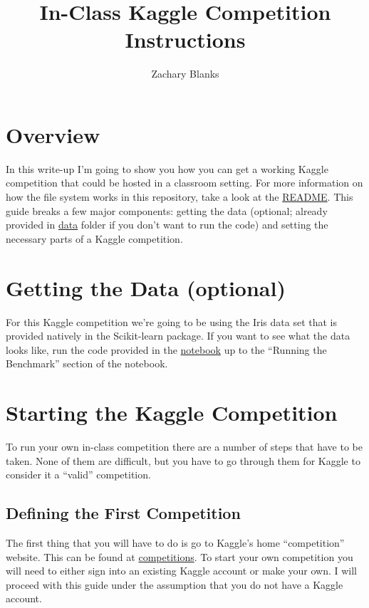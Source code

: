 \documentclass{article}
\title{In-Class Kaggle Competition Instructions}
\author{Zachary Blanks}
\begin{document}
\maketitle

\section{Overview}\label{overview}

In this write-up I'm going to show you how you can get a working Kaggle
competition that could be hosted in a classroom setting. For more
information on how the file system works in this repository, take a look
at the \href{README.md}{README}. This guide breaks a few major
components: getting the data (optional; already provided in
\href{/data}{data} folder if you don't want to run the code) and setting
the necessary parts of a Kaggle competition.

\section{Getting the Data (optional)}\label{getting-the-data-optional}

For this Kaggle competition we're going to be using the Iris data set
that is provided natively in the Scikit-learn package. If you want to
see what the data looks like, run the code provided in the
\href{kaggle-competition-data-benchmark.ipynb}{notebook} up to the
``Running the Benchmark'' section of the notebook.

\section{Starting the Kaggle
Competition}\label{starting-the-kaggle-competition}

To run your own in-class competition there are a number of steps that
have to be taken. None of them are difficult, but you have to go through
them for Kaggle to consider it a ``valid'' competition.

\subsection{Defining the First
Competition}\label{defining-the-first-competition}

The first thing that you will have to do is go to Kaggle's home
``competition'' website. This can be found at
\href{https://www.kaggle.com/competitions}{competitions}. To start your
own competition you will need to either sign into an existing Kaggle
account or make your own. I will proceed with this guide under the
assumption that you do not have a Kaggle account.
\end{document}
